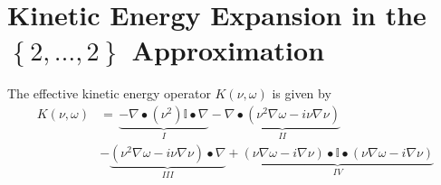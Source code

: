 \documentclass[aps,preprint]{revtex4}%
\begin{document}
\section{ Kinetic Energy Expansion in the $\left\{  2,\ldots,2\right\}  $
Approximation\label{KinEn}}

The effective kinetic energy operator $K\left(  \nu,\omega\right)  $ is given
by%
\begin{align}
K\left(  \nu,\omega\right)   &  =\,\underset{I}{\underbrace{-\nabla
\bullet\left(  \nu^{2}\right)  \mathbb{I}\bullet\nabla}}-\underset
{II}{\underbrace{\nabla\bullet\left(  \nu^{2}\nabla\omega-i\nu\nabla
\nu\right)  }}\nonumber\\
&  -\underset{III}{\underbrace{\left(  \nu^{2}\nabla\omega-i\nu\nabla
\nu\right)  \bullet\nabla}}+\underset{IV}{\underbrace{\left(  \nu\nabla
\omega-i\nabla\nu\right)  \bullet\mathbb{I}\bullet\left(  \nu\nabla
\omega-i\nabla\nu\right)  }}%
\end{align}
\end{document}
